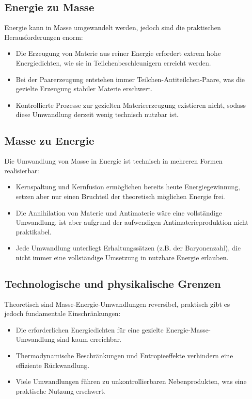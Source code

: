 \documentclass{article}
\begin{document}
	\subsection{Energie zu Masse}
	Energie kann in Masse umgewandelt werden, jedoch sind die praktischen Herausforderungen enorm:
	\begin{itemize}
		\item Die Erzeugung von Materie aus reiner Energie erfordert extrem hohe Energiedichten, wie sie in Teilchenbeschleunigern erreicht werden.
		\item Bei der Paarerzeugung entstehen immer Teilchen-Antiteilchen-Paare, was die gezielte Erzeugung stabiler Materie erschwert.
		\item Kontrollierte Prozesse zur gezielten Materieerzeugung existieren nicht, sodass diese Umwandlung derzeit wenig technisch nutzbar ist.
	\end{itemize}
	
	\subsection{Masse zu Energie}
	Die Umwandlung von Masse in Energie ist technisch in mehreren Formen realisierbar:
	\begin{itemize}
		\item Kernspaltung und Kernfusion ermöglichen bereits heute Energiegewinnung, setzen aber nur einen Bruchteil der theoretisch möglichen Energie frei.
		\item Die Annihilation von Materie und Antimaterie wäre eine vollständige Umwandlung, ist aber aufgrund der aufwendigen Antimaterieproduktion nicht praktikabel.
		\item Jede Umwandlung unterliegt Erhaltungssätzen (z.B. der Baryonenzahl), die nicht immer eine vollständige Umsetzung in nutzbare Energie erlauben.
	\end{itemize}
	
	\subsection{Technologische und physikalische Grenzen}
	Theoretisch sind Masse-Energie-Umwandlungen reversibel, praktisch gibt es jedoch fundamentale Einschränkungen:
	\begin{itemize}
		\item Die erforderlichen Energiedichten für eine gezielte Energie-Masse-Umwandlung sind kaum erreichbar.
		\item Thermodynamische Beschränkungen und Entropieeffekte verhindern eine effiziente Rückwandlung.
		\item Viele Umwandlungen führen zu unkontrollierbaren Nebenprodukten, was eine praktische Nutzung erschwert.
	\end{itemize}
	
\end{document}
